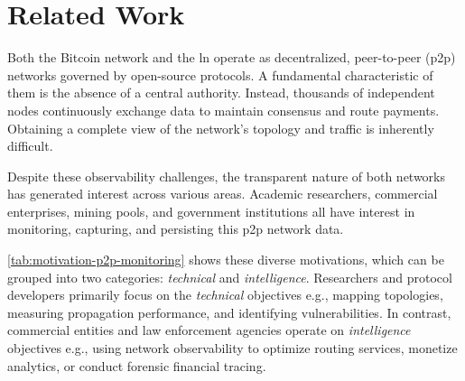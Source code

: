 \chapter{Related Work} 
\label{ch:related-work}

Both the Bitcoin network and the \gls{ln} operate as decentralized, peer-to-peer (\gls{p2p}) networks governed by open-source protocols.
A fundamental characteristic of them is the absence of a central authority. 
Instead, thousands of independent nodes continuously exchange data to maintain consensus and route payments. 
Obtaining a complete view of the network's topology and traffic is inherently difficult.

Despite these observability challenges, the transparent nature of both networks has generated interest across various areas. 
Academic researchers, commercial enterprises, mining pools, and government institutions all have interest in 
monitoring, capturing, and persisting this \gls{p2p} network data. 

\autoref{tab:motivation-p2p-monitoring} shows these diverse motivations, 
which can be grouped into two categories: \textit{technical} and \textit{intelligence}.
Researchers and protocol developers primarily focus on the \textit{technical} objectives 
e.g., mapping topologies, measuring propagation performance, and identifying vulnerabilities. 
In contrast, commercial entities and law enforcement agencies operate on \textit{intelligence} objectives e.g., 
using network observability to optimize routing services, monetize analytics, or conduct forensic financial tracing.

